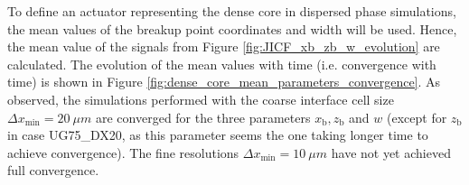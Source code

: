 %


To define an actuator representing the dense core in dispersed phase simulations, the mean values of the breakup point coordinates and width will be used. Hence, the mean value of the signals from Figure \ref{fig:JICF_xb_zb_w_evolution} are calculated. The evolution of the mean values with time (i.e. convergence with time) is shown in Figure \ref{fig:dense_core_mean_parameters_convergence}. As observed, the simulations performed with the coarse interface cell size $\Delta x_\mathrm{min} = 20~\mu m$ are converged for the three parameters $x_\mathrm{b}, z_\mathrm{b}$ and $w$ (except for $z_\mathrm{b}$ in case UG75\_DX20, as this parameter seems the one taking longer time to achieve convergence). The fine resolutions $\Delta x_\mathrm{min} = 10~\mu m$ have not yet achieved full convergence. 

